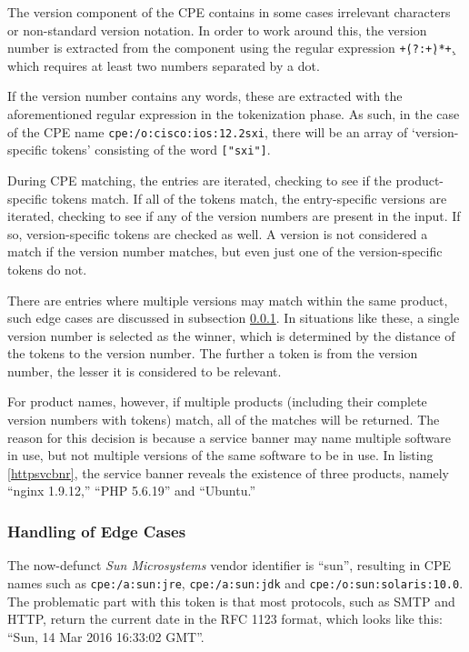 \documentclass[a4paper,12pt]{article}
\begin{document}
	The version component of the CPE contains in some cases irrelevant characters or non-standard version notation. In order to work around this, the version number is extracted from the component using the regular expression \texttt{\d+\.(?:\d+\.)*\d+}, which requires at least two numbers separated by a dot.
	
	If the version number contains any words, these are extracted with the aforementioned regular expression in the tokenization phase. As such, in the case of the CPE name \texttt{cpe:/o:cisco:ios:12.2sxi}, there will be an array of `version-specific tokens' consisting of the word \texttt{["sxi"]}.
	
	During CPE matching, the entries are iterated, checking to see if the product-specific tokens match. If all of the tokens match, the entry-specific versions are iterated, checking to see if any of the version numbers are present in the input. If so, version-specific tokens are checked as well. A version is not considered a match if the version number matches, but even just one of the version-specific tokens do not.
	
	There are entries where multiple versions may match within the same product, such edge cases are discussed in subsection \ref{cpeedges}. In situations like these, a single version number is selected as the winner, which is determined by the distance of the tokens to the version number. The further a token is from the version number, the lesser it is considered to be relevant.
	
	For product names, however, if multiple products (including their complete version numbers with tokens) match, all of the matches will be returned. The reason for this decision is because a service banner may name multiple software in use, but not multiple versions of the same software to be in use. In listing \ref{httpsvcbnr}, the service banner reveals the existence of three products, namely ``nginx 1.9.12,'' ``PHP 5.6.19'' and ``Ubuntu.''
	
\subsubsection{Handling of Edge Cases} \label{cpeedges}
 

	The now-defunct \textit{Sun Microsystems} vendor identifier is ``sun'', resulting in CPE names such as \texttt{cpe:/a:sun:jre}, \texttt{cpe:/a:sun:jdk} and \texttt{cpe:/o:sun:solaris:10.0}. The problematic part with this token is that most protocols, such as SMTP and HTTP, return the current date in the RFC 1123 format\cite{rfc2616}, which looks like this: ``Sun, 14 Mar 2016 16:33:02 GMT''.
	
\end{document}
